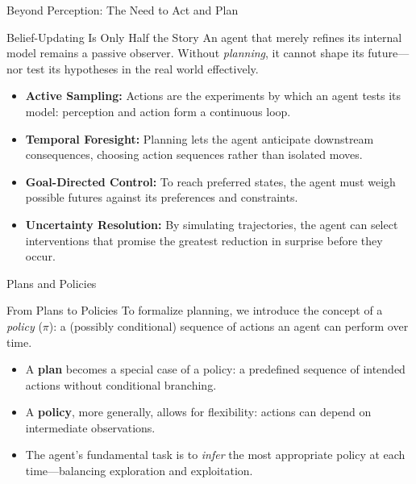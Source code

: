 \documentclass[aspectratio=1610, english]{beamer}
\begin{document}
\begin{frame}{Beyond Perception: The Need to Act and Plan}
     \begin{block}{Belief-Updating Is Only Half the Story}
    An agent that merely refines its internal model remains a passive observer.  
    Without \emph{planning}, it cannot shape its future—nor test its hypotheses in the real world effectively.
  \end{block}

  \vspace{0.3cm}
  \begin{itemize}
    \item \textbf{Active Sampling:}  
      Actions are the experiments by which an agent tests its model:  
      perception and action form a continuous loop.
    \item \textbf{Temporal Foresight:}  
      Planning lets the agent anticipate downstream consequences,  
      choosing action sequences rather than isolated moves.
    \item \textbf{Goal-Directed Control:}  
      To reach preferred states, the agent must weigh possible futures  
      against its preferences and constraints.
    \item \textbf{Uncertainty Resolution:}  
      By simulating trajectories, the agent can select interventions  
      that promise the greatest reduction in surprise before they occur.
  \end{itemize}
\end{frame}

\begin{frame}{Plans and Policies}
  \begin{block}{From Plans to Policies}
    To formalize planning, we introduce the concept of a \emph{policy} (\(\pi\)):  
    a (possibly conditional) sequence of actions an agent can perform over time.
  \end{block}

  \begin{itemize}
    \item A \textbf{plan} becomes a special case of a policy:  
      a predefined sequence of intended actions without conditional branching.
    \item A \textbf{policy}, more generally, allows for flexibility:  
      actions can depend on intermediate observations.
    \item The agent's fundamental task is to \emph{infer} the most appropriate policy  
      at each time—balancing exploration and exploitation.
  \end{itemize}
\end{frame}
\end{document}
